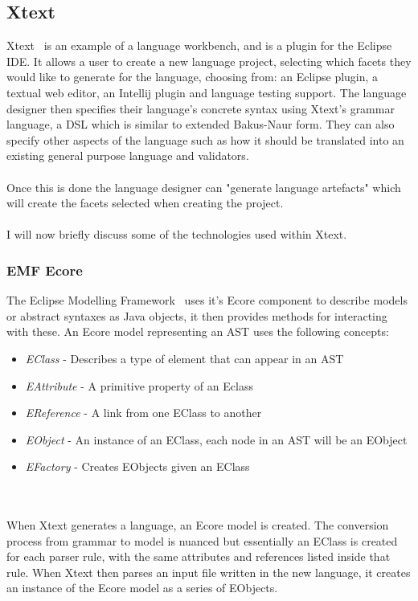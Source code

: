 \documentclass{article}
\begin{document}
\subsection{Xtext}\label{xtext}
Xtext~\cite{xtext} is an example of a language workbench, and is a plugin for the Eclipse IDE. It allows a user to create a new language project, selecting which facets they would like to generate for the language, choosing from: an Eclipse plugin, a textual web editor, an Intellij plugin and language testing support. The language designer then specifies their language's concrete syntax using Xtext's grammar language, a DSL which is similar to extended Bakus-Naur form. They can also specify other aspects of the language such as how it should be translated into an existing general purpose language and validators.
\\
\\
Once this is done the language designer can "generate language artefacts" which will create the facets selected when creating the project. 
\\
\\
I will now briefly discuss some of the technologies used within Xtext.
\subsubsection{EMF Ecore}\label{emf}
The Eclipse Modelling Framework~\cite{emf} uses it's Ecore component to describe models or abstract syntaxes as Java objects, it then provides methods for interacting with these. An Ecore model representing an AST uses the following concepts:
\begin{itemize}
\item \emph{EClass} - Describes a type of element that can appear in an AST
\item \emph{EAttribute} - A primitive property of an Eclass
\item \emph{EReference} - A link from one EClass to another
\item \emph{EObject} - An instance of an EClass, each node in an AST will be an EObject
\item \emph{EFactory} - Creates EObjects given an EClass
\end{itemize}
\\
\\
When Xtext generates a language, an Ecore model is created. The conversion process from grammar to model is nuanced but essentially an EClass is created for each parser rule, with the same attributes and references listed inside that rule. When Xtext then parses an input file written in the new language, it creates an instance of the Ecore model as a series of EObjects.
\end{document}
